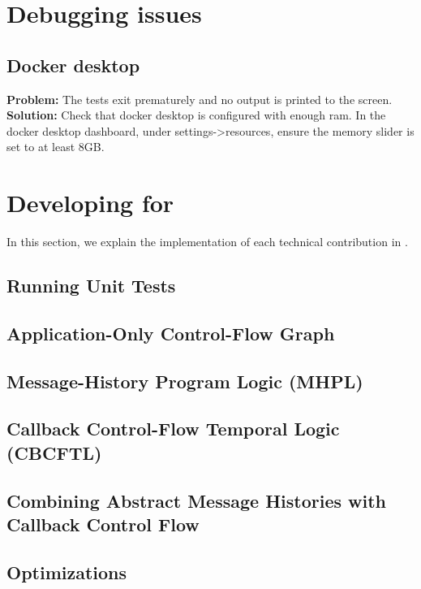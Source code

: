 \documentclass{acmart} %
\newcommand{\inputsection}[1]{\ifthenelse{\boolean{#1}}{}{\TODO{====== temp exclusion section #1 for build =======}}}
\begin{document}


\section{Debugging issues}

\subsection{Docker desktop}
\textbf{Problem:} The tests exit prematurely and no output is printed to the screen.
\textbf{Solution:} Check that docker desktop is configured with enough ram.  In the docker desktop dashboard, under settings->resources, ensure the memory slider is set to at least 8GB.

\section{Developing for \toolname}

In this section, we explain the implementation of each technical contribution in \toolname.

\subsection{Running Unit Tests}



\subsection{Application-Only Control-Flow Graph}

\TODO{}

\subsection{Message-History Program Logic (MHPL)}

\TODO{}

\subsection{Callback Control-Flow Temporal Logic (CBCFTL)}

\TODO{}

\subsection{Combining Abstract Message Histories with Callback Control Flow}

\TODO{}

\subsection{Optimizations}

\TODO{}




\end{document}
